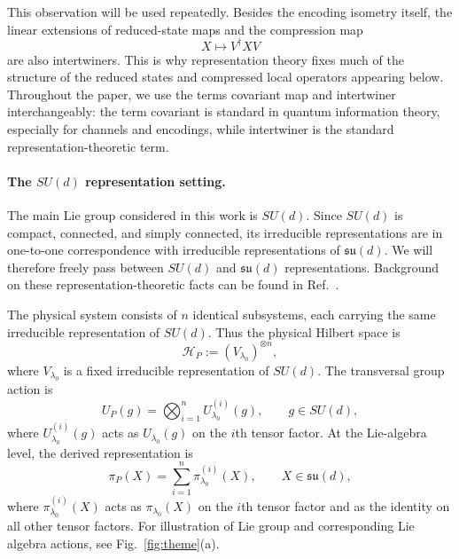 \documentclass[10pt,twocolumn,superscriptaddress,aps,amsmath,amssymb,citeautoscript,floatfix,prx]{revtex4-2}
\newcounter{alg}
\theoremstyle{plain}
\theoremstyle{plain}
\theoremstyle{plain}
\theoremstyle{plain}
\theoremstyle{plain}
\theoremstyle{plain}
\begin{document}
This observation will be used repeatedly. Besides the encoding isometry itself, the linear extensions of reduced-state maps and the compression map
$$
X
\longmapsto
V^\dagger X V
$$
are also intertwiners. This is why representation theory fixes much of the structure of the reduced states and compressed local operators appearing below. Throughout the paper, we use the terms covariant map and intertwiner interchangeably: the term covariant is standard in quantum information theory, especially for channels and encodings, while intertwiner is the standard representation-theoretic term.

\paragraph{The $SU(d)$ representation setting.}

The main Lie group considered in this work is $SU(d)$. Since $SU(d)$ is compact, connected, and simply connected, its irreducible representations are in one-to-one correspondence with irreducible representations of $\mathfrak{su}(d)$. We will therefore freely pass between $SU(d)$ and $\mathfrak{su}(d)$ representations. Background on these representation-theoretic facts can be found in Ref.~\cite{Hall2015}.

The physical system consists of $n$ identical subsystems, each carrying the same irreducible representation of $SU(d)$. Thus the physical Hilbert space is
\begin{equation}\label{eq:phys_space_rep}
\mathcal H_P
:=
(V_{\lambda_0})^{\otimes n},
\end{equation}
where $V_{\lambda_0}$ is a fixed irreducible representation of $SU(d)$. The transversal group action is
\begin{equation}\label{eq:group_phys_space_rep}
U_P(g)
=
\bigotimes_{i=1}^n
U_{\lambda_0}^{(i)}(g),
\qquad
g\in SU(d),
\end{equation}
where $U_{\lambda_0}^{(i)}(g)$ acts as $U_{\lambda_0}(g)$ on the $i$th tensor factor. At the Lie-algebra level, the derived representation is
\begin{equation}\label{eq:alg_phys_space_rep}
\pi_P(X)
=
\sum_{i=1}^n
\pi_{\lambda_0}^{(i)}(X),
\qquad
X\in\mathfrak{su}(d),
\end{equation}
where $\pi_{\lambda_0}^{(i)}(X)$ acts as $\pi_{\lambda_0}(X)$ on the $i$th tensor factor and as the identity on all other tensor factors. For illustration of Lie group and corresponding Lie algebra actions, see Fig.~\ref{fig:theme}(a).
\end{document}
